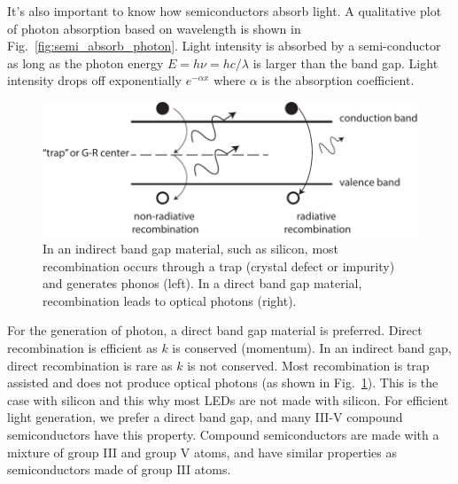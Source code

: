 It's also important to know how semiconductors absorb light.  A qualitative plot of photon absorption based on wavelength is shown in Fig.~\ref{fig:semi_absorb_photon}.  Light intensity is absorbed by a semi-conductor as long as the photon energy $E = h\nu = hc/\lambda $ is larger than the band gap.   Light intensity drops off exponentially $e^{-\alpha x}$ where $\alpha$ is the absorption coefficient.  
\begin{figure}[tb]
\begin{center}
\includegraphics[width=.75\columnwidth]{rad_vs_nonrad_reco}
\end{center}
\caption{In an indirect band gap material, such as silicon, most recombination occurs through a trap (crystal defect or impurity) and generates phonos (left).  In a direct band gap material, recombination leads to optical photons (right).}
\label{fig:rad_vs_nonrad_reco}
\end{figure}

For the generation of photon, a direct band gap material is preferred.  Direct recombination is efficient as $k$ is conserved (momentum).  In an indirect band gap, direct recombination is rare as $k$ is not conserved.  Most recombination is trap assisted and does not produce optical photons (as shown in Fig.~\ref{fig:rad_vs_nonrad_reco}).  This is the case with silicon and this why most LEDs are not made with silicon. For efficient light generation, we prefer a direct band gap, and many III-V compound semiconductors have this property.  Compound semiconductors are made with a mixture of group III and group V atoms, and have similar properties as semiconductors made of group III atoms.

